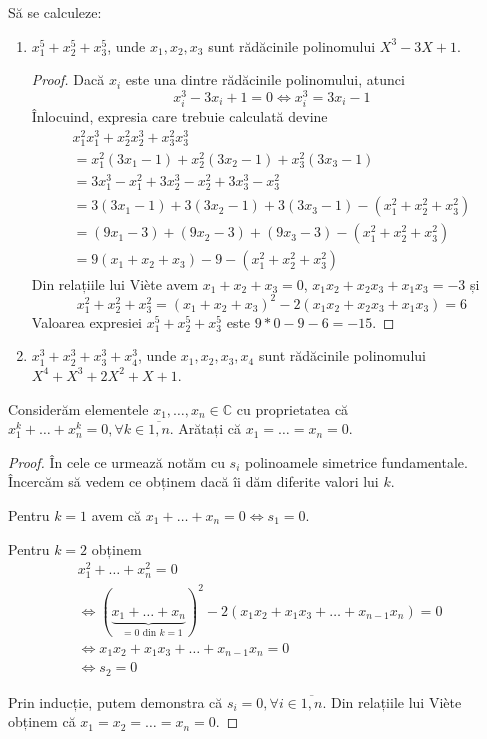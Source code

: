 \begin{exercise}[4.22]
Să se calculeze:
\begin{enumerate}
    \item \(x_1^5 + x_2^5 + x_3^5\), unde \(x_1, x_2, x_3\) sunt rădăcinile polinomului \(X^3 - 3X + 1\).
    \begin{proof}
    Dacă \(x_i\) este una dintre rădăcinile polinomului, atunci
    \[
    x_i^3 - 3x_i + 1 = 0 \iff x_i^3 = 3x_i - 1
    \]
    Înlocuind, expresia care trebuie calculată devine
    \begin{gather*}
    x_1^2 x_1^3 + x_2^2 x_2^3 + x_3^2 x_3^3 \\
    = x_1^2(3x_1 - 1) + x_2^2(3x_2 - 1) + x_3^2(3x_3 - 1) \\
    = 3x_1^3 - x_1^2 + 3x_2^3 - x_2^2 + 3x_3^3 - x_3^2 \\
    = 3(3x_1 - 1) + 3(3x_2 - 1) + 3(3x_3 - 1) - (x_1^2 + x_2^2 + x_3^2) \\ 
    = (9x_1 - 3) + (9x_2 - 3) + (9x_3 - 3) - (x_1^2 + x_2^2 + x_3^2) \\
    = 9(x_1 + x_2 + x_3) - 9 - (x_1^2 + x_2^2 + x_3^2)
    \end{gather*}
    Din relațiile lui Viète avem \(x_1 + x_2 + x_3 = 0\), \(x_1 x_2 + x_2 x_3 + x_1 x_3 = -3\) și
    \[
    x_1^2 + x_2^2 + x_3^2 = (x_1 + x_2 + x_3)^2 - 2(x_1 x_2 + x_2 x_3 + x_1 x_3) = 6
    \]
    Valoarea expresiei \(x_1^5 + x_2^5 + x_3^5\) este \(9 * 0 - 9 - 6 = -15\).
    \end{proof}
    \item \(x_1^3 + x_2^3 + x_3^3 + x_4^3\), unde \(x_1, x_2, x_3, x_4\) sunt rădăcinile polinomului \(X^4 + X^3 + 2X^2 + X + 1\).
\end{enumerate}
\end{exercise}

\begin{exercise}[4.23]
Considerăm elementele \(x_1, \dots, x_n \in \mathbb{C}\) cu proprietatea că \(x_1^k + \dots + x_n^k = 0, \forall k \in \overline{1, n}\). Arătați că \(x_1 = \dots = x_n = 0\).
\end{exercise}
\begin{proof}
În cele ce urmează notăm cu \(s_i\) polinoamele simetrice fundamentale. Încercăm să vedem ce obținem dacă îi dăm diferite valori lui \(k\). 

Pentru \(k = 1\) avem că \(x_1 + \dots + x_n = 0 \iff s_1 = 0\).

Pentru \(k = 2\) obținem 
\begin{gather*}
    x_1^2 + \dots + x_n^2 = 0 \\
    \iff (\underbrace{x_1 + \dots + x_n}_{\text{ \(= 0\) din \(k = 1\)}})^2 - 2(x_1 x_2 + x_1 x_3 + \dots + x_{n-1} x_n) = 0 \\
    \iff x_1 x_2 + x_1 x_3 + \dots + x_{n-1} x_n = 0 \\
    \iff s_2 = 0
\end{gather*}

Prin inducție, putem demonstra că \(s_i = 0, \forall i \in \overline{1, n}\). Din relațiile lui Viète obținem că \(x_1 = x_2 = \dots = x_n = 0\).
\end{proof}

